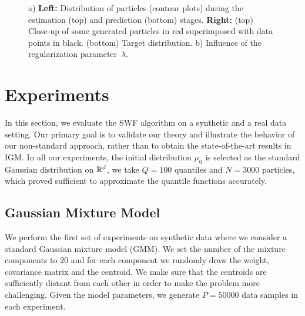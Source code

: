 
\begin{figure*}
\centering
{} \hspace{30pt}
\caption{a) \textbf{Left:} Distribution of particles (contour plots) during the estimation (top) and prediction (bottom) stages. \textbf{Right:} (top) Close-up of some generated particles in red superimposed with data points in black. (bottom) Target distribution. b) Influence of the regularization parameter~$\lambda$. }
\label{fig:gmm1}
\end{figure*}

\section{Experiments}


%
In this section, we evaluate the SWF algorithm on a synthetic and a real data setting. Our primary goal is to validate our theory and illustrate the behavior of our non-standard approach, rather than to obtain the state-of-the-art results in IGM. In all our experiments, the initial distribution $\mu_0$ is selected as the standard Gaussian distribution on $\mathbb{R}^d$, we take $Q=100$ quantiles and $N=3000$ particles, which proved sufficient to approximate the quantile functions accurately. %



\subsection{Gaussian Mixture Model }
We perform the first set of experiments on synthetic data where we consider a standard Gaussian mixture model (GMM).
%
We set the number of the mixture components to $20$ and for each component we randomly draw the weight, covariance matrix and the centroid. We make sure that the centroids are sufficiently distant from each other in order to make the problem more challenging. Given the model parameters, we generate $P=50000$ data samples in each experiment.


